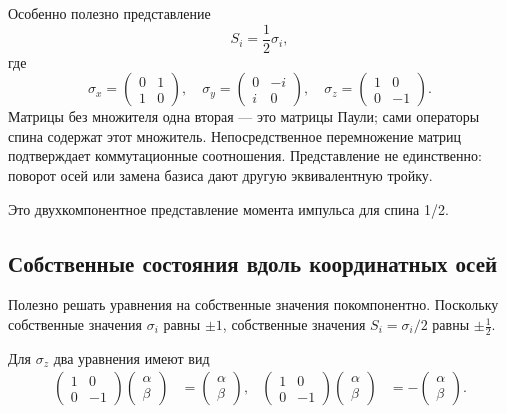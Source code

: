 Особенно полезно представление
\begin{equation}
S_i=\frac12\sigma_i,
\end{equation}
где
\begin{equation}
\sigma_x=
\begin{pmatrix}
0&1\\
1&0
\end{pmatrix},
\quad
\sigma_y=
\begin{pmatrix}
0&-i\\
i&0
\end{pmatrix},
\quad
\sigma_z=
\begin{pmatrix}
1&0\\
0&-1
\end{pmatrix}.
\end{equation}
Матрицы без множителя одна вторая — это матрицы Паули; сами операторы спина содержат этот множитель. Непосредственное перемножение матриц подтверждает коммутационные соотношения. Представление не единственно: поворот осей или замена базиса дают другую эквивалентную тройку.

Это двухкомпонентное представление момента импульса для спина 1/2.

\subsection{Собственные состояния вдоль координатных осей}

Полезно решать уравнения на собственные значения покомпонентно. Поскольку собственные значения \(\sigma_i\) равны \(\pm1\), собственные значения \(S_i=\sigma_i/2\) равны \(\pm\tfrac12\).

Для \(\sigma_z\) два уравнения имеют вид
\begin{align}
\begin{pmatrix}
1&0\\
0&-1
\end{pmatrix}
\begin{pmatrix}
\alpha\\
\beta
\end{pmatrix}
&=
\begin{pmatrix}
\alpha\\
\beta
\end{pmatrix},
&
\begin{pmatrix}
1&0\\
0&-1
\end{pmatrix}
\begin{pmatrix}
\alpha\\
\beta
\end{pmatrix}
&=
-
\begin{pmatrix}
\alpha\\
\beta
\end{pmatrix}.
\end{align}


